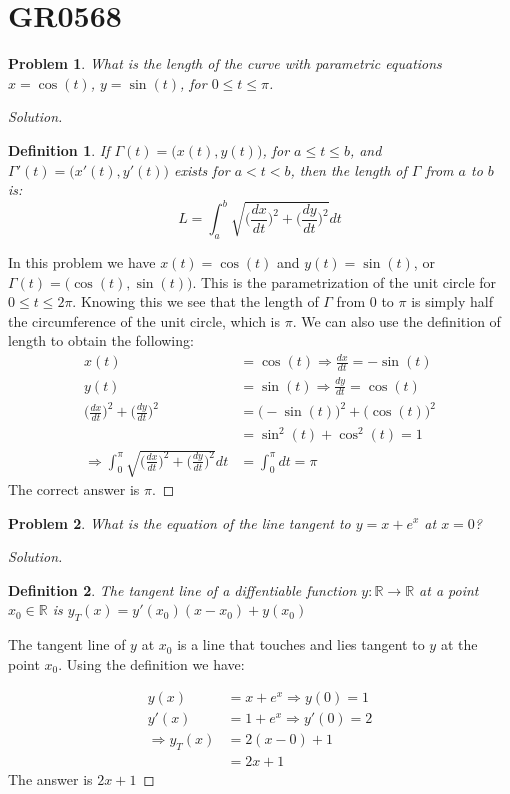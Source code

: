 \documentclass[oneside]{book}
\theoremstyle{mystyle}
\newtheorem{definition}{Definition}[section]
\newtheorem{problem}{Problem}[section]
\begin{document}
\section{GR0568}
%
\begin{problem}
What is the length of the curve with parametric equations $x=\cos(t)$, $y=\sin(t)$, for $0\leq t \leq \pi$.
\end{problem}
\begin{proof}[Solution]

\begin{definition}
If $\Gamma(t) = \big(x(t),y(t)\big)$, for $a\leq t \leq b$, and $\Gamma'(t) = \big(x'(t),y'(t)\big)$ exists for $a<t<b$, then the length of $\Gamma$ from $a$ to $b$ is:
\begin{equation}
    L = \int_{a}^{b}\sqrt{\bigg(\frac{dx}{dt}\bigg)^2+\bigg(\frac{dy}{dt}\bigg)^2}dt
\end{equation}
\end{definition}
\noindent In this problem we have $x(t) = \cos(t)$ and $y(t) = \sin(t)$, or $\Gamma(t) = \big(\cos(t),\sin(t)\big)$. This is the parametrization of the unit circle for $0\leq t \leq 2\pi$. Knowing this we see that the length of $\Gamma$ from $0$ to $\pi$ is simply half the circumference of the unit circle, which is $\pi$. We can also use the definition of length to obtain the following:
\begin{align}
    \nonumber x(t) &= \cos(t) \Rightarrow \frac{dx}{dt} = -\sin(t) \\
    \nonumber y(t) &= \sin(t) \Rightarrow \frac{dy}{dt} = \cos(t) \\
    \nonumber \bigg(\frac{dx}{dt}\bigg)^2 + \bigg(\frac{dy}{dt}\bigg)^2 &= \big(-\sin(t)\big)^2 +\big(\cos(t)\big)^2 \\
    \nonumber &= \sin^2(t) + \cos^2(t) = 1\\
    \nonumber \Rightarrow \int_{0}^{\pi} \sqrt{\bigg(\frac{dx}{dt}\bigg)^2+\bigg(\frac{dy}{dt}\bigg)^2}dt &= \int_{0}^{\pi}dt = \pi
\end{align}
The correct answer is $\pi$.
\end{proof}

\begin{problem}
What is the equation of the line tangent to $y=x+e^x$ at $x=0$?
\end{problem}
\begin{proof}[Solution]
\begin{definition}
\noindent The tangent line of a diffentiable function $y:\mathbb{R}\rightarrow \mathbb{R}$ at a point $x_0\in \mathbb{R}$ is $y_T(x) = y'(x_0)(x-x_0) + y(x_0)$ 
\end{definition}
The tangent line of $y$ at $x_0$ is a line that touches and lies tangent to $y$ at the point $x_0$. Using the definition we have:

\begin{align}
\nonumber y(x) &= x+e^x \Rightarrow y(0) = 1 \\
\nonumber y'(x) &= 1+e^x\Rightarrow y'(0) = 2\\
\nonumber \Rightarrow y_T(x) &= 2(x-0) + 1\\
\nonumber &= 2x+1
\end{align}
The answer is $2x+1$
\end{proof}
\end{document}
